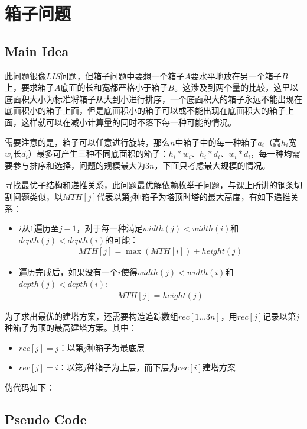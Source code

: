 \documentclass{ctexart}
\begin{document}
\section{箱子问题}

\subsection{Main Idea}
此问题很像$LIS$问题，但箱子问题中要想一个箱子$A$要水平地放在另一个箱子$B$上，要求箱子$A$底面的长和宽都严格小于箱子$B$。这涉及到两个量的比较，这里以底面积大小为标准将箱子从大到小进行排序，一个底面积大的箱子永远不能出现在底面积小的箱子上面，但是底面积小的箱子可以或不能出现在底面积大的箱子上面，这样就可以在减小计算量的同时不落下每一种可能的情况。

需要注意的是，箱子可以任意进行旋转，那么$n$中箱子中的每一种箱子$a_i$（高$h_i$宽$w_i$长$d_i$）最多可产生三种不同底面积的箱子：$h_i * w_i$、$h_i * d_i$、$w_i * d_i$，每一种均需要参与排序和选择，问题的规模最大为$3n$，下面只考虑最大规模的情况。

寻找最优子结构和递推关系，此问题最优解依赖枚举子问题，与课上所讲的钢条切割问题类似，以$MTH[j]$代表以第$j$种箱子为塔顶时塔的最大高度，有如下递推关系：
\begin{itemize}
    \item $i$从$1$遍历至$j-1$，对于每一种满足$width(j)<width(i)$和$depth(j)<depth(i)$的可能：
    \begin{align*}
    MTH[j] = \max(MTH[i]) + height(j)
\end{align*}
    \item 遍历完成后，如果没有一个$i$使得$width(j)<width(i)$和$depth(j)<depth(i)$:
    \begin{align*}
    MTH[j] = height(j)
\end{align*}
\end{itemize}


为了求出最优的建塔方案，还需要构造追踪数组$rec[1 \ldots 3n]$，用$rec[j]$记录以第$j$种箱子为顶的最高建塔方案。其中：
\begin{itemize}
    \item $rec[j]=j$：以第$j$种箱子为最底层
    \item $rec[j]=i$：以第$j$种箱子为上层，而下层为$rec[i]$建塔方案
\end{itemize}

伪代码如下：
\subsection{Pseudo Code}
\end{document}
